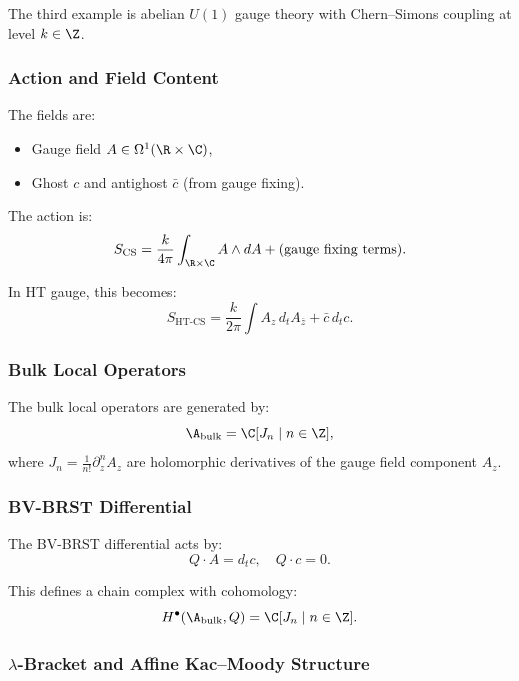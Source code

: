The third example is abelian $U(1)$ gauge theory with Chern--Simons coupling at level $k \in \Z$.

\subsubsection{Action and Field Content}

The fields are:
\begin{itemize}
\item Gauge field $A \in \Omega^1(\R \times \C)$,
\item Ghost $c$ and antighost $\bar{c}$ (from gauge fixing).
\end{itemize}

The action is:
\begin{equation}
\label{eq:CS_action}
S_{\text{CS}} = \frac{k}{4\pi} \int_{\R \times \C} A \wedge dA + \text{(gauge fixing terms)}.
\end{equation}

In HT gauge, this becomes:
\begin{equation}
S_{\text{HT-CS}} = \frac{k}{2\pi} \int A_z \, d_t A_{\bar{z}} + \bar{c} \, d_t c.
\end{equation}

\subsubsection{Bulk Local Operators}

The bulk local operators are generated by:
\begin{equation}
\A_{\text{bulk}} = \C[J_n \mid n \in \Z],
\end{equation}
where $J_n = \frac{1}{n!} \partial_z^n A_z$ are holomorphic derivatives of the gauge field component $A_z$.

\subsubsection{BV-BRST Differential}

The BV-BRST differential acts by:
\begin{equation}
Q \cdot A = d_t c, \quad Q \cdot c = 0.
\end{equation}

This defines a chain complex with cohomology:
\begin{equation}
H^\bullet(\A_{\text{bulk}}, Q) = \C[J_n \mid n \in \Z].
\end{equation}

\subsubsection{$\lambda$-Bracket and Affine Kac--Moody Structure}

